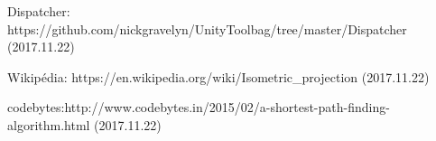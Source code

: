 \begin{thebibliography}{x}
 Dispatcher:\; \newline https://github.com/nickgravelyn/UnityToolbag/tree/master/Dispatcher (2017.11.22)

 Wikipédia: https://en.wikipedia.org/wiki/Isometric\_projection (2017.11.22)

 codebytes:\;http://www.codebytes.in/2015/02/a-shortest-path-finding-algorithm.html (2017.11.22)



\end{thebibliography}

